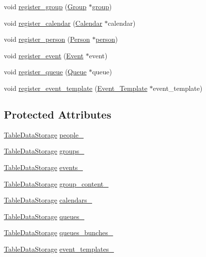 \begin{DoxyCompactItemize}
void \hyperlink{classstorage_1_1DataStorage_aa29c972a9d8e25c54703435b79060ccf}{register\_\-group} (\hyperlink{classGroup}{Group} $\ast$\hyperlink{group__content_8h_a27517aa1480ab2d9bfe5d62e693b33eb}{group})
\item 
void \hyperlink{classstorage_1_1DataStorage_a4aea70365b132555020159c04121a9a0}{register\_\-calendar} (\hyperlink{classCalendar}{Calendar} $\ast$calendar)
\item 
void \hyperlink{classstorage_1_1DataStorage_ab397fd5fc17fb58e45b2968b165c95dd}{register\_\-person} (\hyperlink{classPerson}{Person} $\ast$\hyperlink{group__content_8h_ab8664e6fd42f01eeaad084b5e20eb54e}{person})
\item 
void \hyperlink{classstorage_1_1DataStorage_a2c63723d6bb413a0d630b05a045935e1}{register\_\-event} (\hyperlink{classEvent}{Event} $\ast$event)
\item 
void \hyperlink{classstorage_1_1DataStorage_a78b6e15d0d878cc5113cba50dae7c73b}{register\_\-queue} (\hyperlink{classQueue}{Queue} $\ast$queue)
\item 
void \hyperlink{classstorage_1_1DataStorage_a3984bdbb2a2aecfaca0a4745df0f7850}{register\_\-event\_\-template} (\hyperlink{classEvent__Template}{Event\_\-Template} $\ast$event\_\-template)
\end{DoxyCompactItemize}
\subsection*{Protected Attributes}
\begin{DoxyCompactItemize}
\item 
\hyperlink{classstorage_1_1TableDataStorage}{TableDataStorage} \hyperlink{classstorage_1_1DataStorage_a8c32de002329fa6018a0957c925cf183}{people\_\-}
\item 
\hyperlink{classstorage_1_1TableDataStorage}{TableDataStorage} \hyperlink{classstorage_1_1DataStorage_a08dbec98bdd6b7c3e6623a8bbe72235c}{groups\_\-}
\item 
\hyperlink{classstorage_1_1TableDataStorage}{TableDataStorage} \hyperlink{classstorage_1_1DataStorage_a16f699e52132096d7e8ec8d43c73ad1f}{events\_\-}
\item 
\hyperlink{classstorage_1_1TableDataStorage}{TableDataStorage} \hyperlink{classstorage_1_1DataStorage_ac49bf760dd1492eb566e7bbbf9d84743}{group\_\-content\_\-}
\item 
\hyperlink{classstorage_1_1TableDataStorage}{TableDataStorage} \hyperlink{classstorage_1_1DataStorage_adc094f1bdcad1fd0940c947d2b0529b9}{calendars\_\-}
\item 
\hyperlink{classstorage_1_1TableDataStorage}{TableDataStorage} \hyperlink{classstorage_1_1DataStorage_af9a0216e83d32b996086a0b15a5281ab}{queues\_\-}
\item 
\hyperlink{classstorage_1_1TableDataStorage}{TableDataStorage} \hyperlink{classstorage_1_1DataStorage_a19686eeb613ff2ade96fd557b26627f1}{queues\_\-bunches\_\-}
\item 
\hyperlink{classstorage_1_1TableDataStorage}{TableDataStorage} \hyperlink{classstorage_1_1DataStorage_a96b081918351159d88994b382f1b97e2}{event\_\-templates\_\-}
\end{DoxyCompactItemize}


